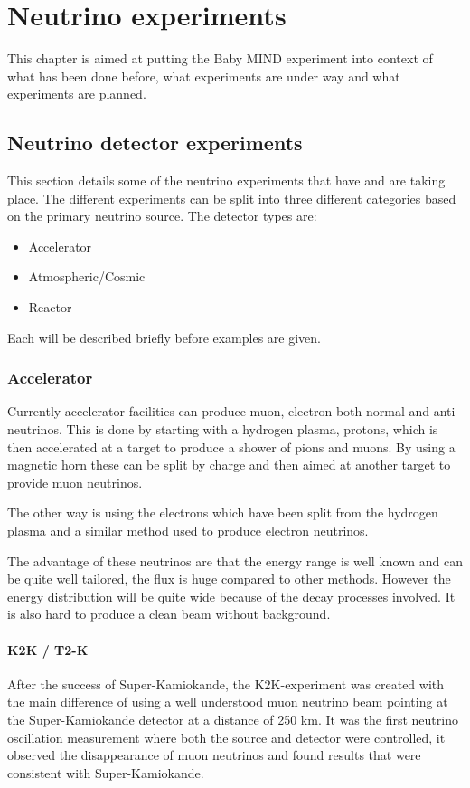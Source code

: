 \chapter{Neutrino  experiments}
\label{c:expIntro}

This chapter is aimed at putting the Baby MIND experiment into context of what has been done before, what experiments are under way and what experiments are planned.

\section{Neutrino detector experiments}

This section details some of the neutrino experiments that have and are taking place. The different experiments can be split into three different categories based on the primary neutrino source.
The detector types are:
\begin{itemize}
\item Accelerator
\item Atmospheric/Cosmic
\item Reactor
\end{itemize}
Each will be described briefly before examples are given.

\subsection{Accelerator}
Currently accelerator facilities can produce muon, electron both normal and anti neutrinos. This is done by starting with a hydrogen plasma, protons, which is then accelerated at a target to produce a shower of pions and muons. By using a magnetic horn these can be split by charge and then aimed at another target to provide muon neutrinos.

The other way is using the electrons which have been split from the hydrogen plasma and a similar method used to produce electron neutrinos.

The advantage of these neutrinos are that the energy range is well known and can be quite well tailored, the flux is huge compared to other methods. However the energy distribution will be quite wide because of the decay processes involved. It is also hard to produce a clean beam without background.

\subsubsection{K2K / T2-K}
After the success of Super-Kamiokande, the K2K-experiment\cite{22K2K} was created with the main difference of using a well understood muon neutrino beam pointing at the Super-Kamiokande detector at a distance of 250 km. It was the first neutrino oscillation measurement where both the source and detector were controlled, it observed the disappearance of muon neutrinos and found results that were consistent with Super-Kamiokande.

